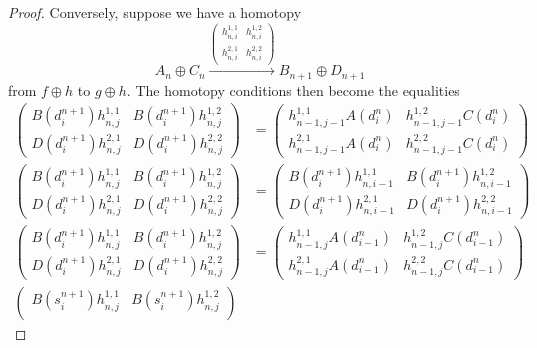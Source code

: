 \begin{proof}
    Conversely, suppose we have a homotopy 
    \begin{equation*}
        A_n\oplus C_n\xrightarrow{\begin{pmatrix} h_{n,i}^{1,1} & h_{n,i}^{1,2} \\ h_{n,i}^{2,1} & h_{n,i}^{2,2} \end{pmatrix}} B_{n+1}\oplus D_{n+1}
    \end{equation*}
    from $f\oplus h$ to $g \oplus h$. The homotopy conditions then become the equalities
    \begin{align*}
        \begin{pmatrix} B(d_i^{n+1})h_{n,j}^{1,1} & B(d_i^{n+1})h_{n,j}^{1,2} \\
        D(d_i^{n+1})h_{n,j}^{2,1} & D(d_i^{n+1})h_{n,j}^{2,2} \end{pmatrix} &= \begin{pmatrix} h_{n-1,j-1}^{1,1}A(d_i^{n}) & h_{n-1,j-1}^{1,2}C(d_i^{n}) \\
        h_{n-1,j-1}^{2,1}A(d_i^{n}) & h_{n-1,j-1}^{2,2}C(d_i^{n}) \end{pmatrix} \tag{$i < j$} \\
        \begin{pmatrix} B(d_i^{n+1})h_{n,j}^{1,1} & B(d_i^{n+1})h_{n,j}^{1,2} \\
        D(d_i^{n+1})h_{n,j}^{2,1} & D(d_i^{n+1})h_{n,j}^{2,2} \end{pmatrix} &= \begin{pmatrix} B(d_i^{n+1})h_{n,i-1}^{1,1} & B(d_i^{n+1})h_{n,i-1}^{1,2} \\
        D(d_i^{n+1})h_{n,i-1}^{2,1} & D(d_i^{n+1})h_{n,i-1}^{2,2} \end{pmatrix} \tag{$i = j \neq 0$} \\
        \begin{pmatrix} B(d_i^{n+1})h_{n,j}^{1,1} & B(d_i^{n+1})h_{n,j}^{1,2} \\
        D(d_i^{n+1})h_{n,j}^{2,1} & D(d_i^{n+1})h_{n,j}^{2,2} \end{pmatrix} &= \begin{pmatrix} h_{n-1,j}^{1,1}A(d_{i-1}^{n}) & h_{n-1,j}^{1,2}C(d_{i-1}^{n}) \\
        h_{n-1,j}^{2,1}A(d_{i-1}^{n}) & h_{n-1,j}^{2,2}C(d_{i-1}^{n}) \end{pmatrix} \tag{$i > j+1$} \\
        \begin{pmatrix} B(s_i^{n+1})h_{n,j}^{1,1} & B(s_i^{n+1})h_{n,j}^{1,2} \\

\end{pmatrix}
\end{align*}
\end{proof}
